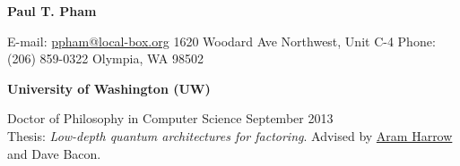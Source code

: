 \documentclass[letter]{article}
\begin{document}
\thispagestyle{firststyle} %

\reversemarginpar		%

{\LARGE {\bf Paul T. Pham}}
\par
\vspace{.25in}
E-mail: \href{mailto:ppham@local-box.org}{ppham@local-box.org}
\hspace*{\fill}
1620 Woodard Ave Northwest, Unit C-4
\linebreak
Phone: (206) 859-0322
\hspace*{\fill}
Olympia, WA 98502

\par
\vspace{.25in}



{\bf University of Washington (UW)}
\par
Doctor of Philosophy in Computer Science \hspace*{\fill}September 2013\\
Thesis: \emph{Low-depth quantum architectures for factoring}.
Advised by \href{http://www.cs.washington.edu/people/faculty/aram/}{Aram Harrow}
and Dave Bacon.
\vspace{\baselineskip}
\par
\end{document}
